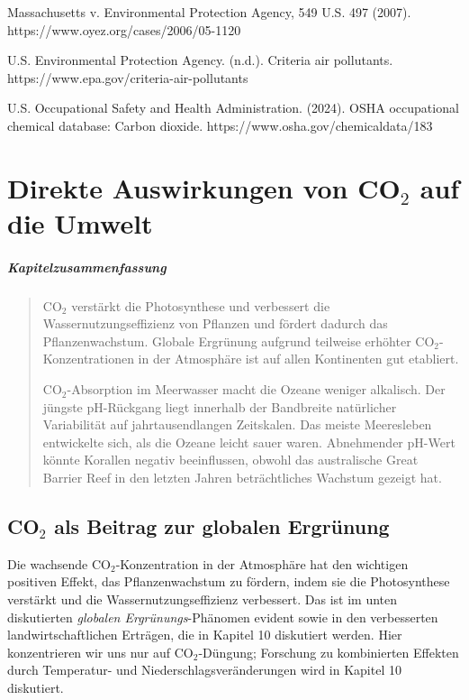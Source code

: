 \documentclass[12pt,paper=a4,DIV=12,parskip=never,chapterprefix=false,headings=standardclasses]{scrreprt}
\begin{document}
Massachusetts v. Environmental Protection Agency, 549 U.S. 497 (2007).\\ https://www.oyez.org/cases/2006/05-1120

U.S. Environmental Protection Agency. (n.d.). Criteria air pollutants.\\ https://www.epa.gov/criteria-air-pollutants

U.S. Occupational Safety and Health Administration. (2024). OSHA occupational chemical database: Carbon dioxide. https://www.osha.gov/chemicaldata/183
\endgroup

\chapter{Direkte Auswirkungen von CO$_2$ auf die Umwelt}
\paragraph{Kapitelzusammenfassung}
\begin{quote}
CO$_2$ verstärkt die Photosynthese und verbessert die Wassernutzungseffizienz von Pflanzen und fördert dadurch das Pflanzenwachstum. Globale Ergrünung aufgrund teilweise erhöhter CO$_2$-Konzentrationen in der Atmosphäre ist auf allen Kontinenten gut etabliert.

CO$_2$-Absorption im Meerwasser macht die Ozeane weniger alkalisch. Der jüngste pH-Rückgang liegt innerhalb der Bandbreite natürlicher Variabilität auf jahrtausendlangen Zeitskalen. Das meiste Meeresleben entwickelte sich, als die Ozeane leicht sauer waren. Abnehmender pH-Wert könnte Korallen negativ beeinflussen, obwohl das australische Great Barrier Reef in den letzten Jahren beträchtliches Wachstum gezeigt hat.
\end{quote}

\section{CO$_2$ als Beitrag zur globalen Ergrünung}

Die wachsende CO$_2$-Konzentration in der Atmosphäre hat den wichtigen positiven Effekt, das Pflanzenwachstum zu fördern, indem sie die Photosynthese verstärkt und die Wassernutzungseffizienz verbessert. Das ist im unten diskutierten \emph{globalen Ergrünungs}-Phänomen evident sowie in den verbesserten landwirtschaftlichen Erträgen, die in Kapitel 10 diskutiert werden. Hier konzentrieren wir uns nur auf CO$_2$-Düngung; Forschung zu kombinierten Effekten durch Temperatur- und Niederschlagsveränderungen wird in Kapitel 10 diskutiert.
\end{document}
